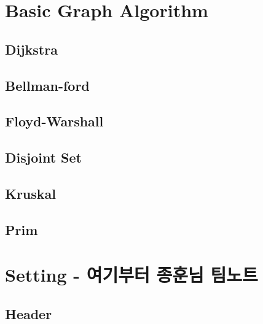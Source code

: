 \documentclass[10pt,landscape,a4paper,twocolumn]{article}
\begin{document}
\section{Basic Graph Algorithm}

\subsection{Dijkstra}


\subsection{Bellman-ford}


\subsection{Floyd-Warshall}


\subsection{Disjoint Set}


\vfill
\newpage

\subsection{Kruskal}


\vfill
\newpage

\subsection{Prim}


\vfill
\newpage

\section{Setting - 여기부터 종훈님 팀노트}
\subsection{Header}


%
%
%
\end{document}
